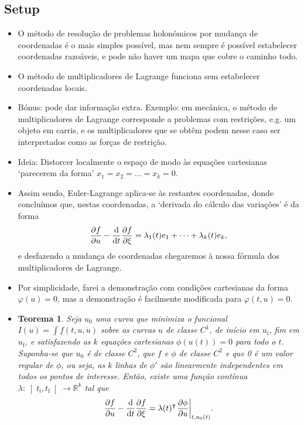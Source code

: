 \documentclass{article}
\theoremstyle{plain}
\newtheorem{theorem}{Teorema}
\theoremstyle{plain}
\theoremstyle{nonumberplain}
\theoremstyle{empty}
\newcommand{\R}{\mathbb{R}}
\newcommand{\tr}{\intercal}
\newcommand{\tstart}{\mathrm{i}}
\newcommand{\tend}{\mathrm{f}}
\DeclarePairedDelimiter\eval{.}{\rvert}
\begin{document}
\subsection{Setup}

\begin{itemize}
\item O método de resolução de problemas holonómicos por mudança de coordenadas é o mais simples possível, mas nem sempre é possível estabelecer coordenadas razoáveis, e pode não haver um mapa que cobre o caminho todo.

\item O método de multiplicadores de Lagrange funciona sem estabelecer coordenadas locais.

\item Bónus: pode dar informação extra. Exemplo: em mecânica, o método de multiplicadores de Lagrange corresponde a problemas com restrições, e.g. um objeto em carris, e os multiplicadores que se obtêm podem nesse caso ser interpretados como as forças de restrição.

\item Ideia: Distorcer localmente o espaço de modo às equações cartesianas `parecerem da forma' $x_1 = x_2 = \dots = x_k = 0$.

\item Assim sendo, Euler-Lagrange aplica-se às restantes coordenadas, donde concluímos que, nestas coordenadas, a `derivada do cálculo das variações' é da forma
\[\diffp f u - \diff*{\diffp f \xi}t = \lambda_1(t) e_1 + \dots + \lambda_k(t) e_k,\]
e desfazendo a mudança de coordenadas chegaremos à nossa fórmula dos multiplicadores de Lagrange.

\item Por simplicidade, farei a demonstração com condições cartesianas da forma $\varphi(u) = 0$, mas a demonstração é facilmente modificada para $\varphi(t,u) = 0$.

\item \begin{theorem}\label{lagrangeholonomic}
Seja $u_0$ uma curva que minimiza o funcional $I(u) = \int f(t,u,\dot u)$ sobre as curvas $u$ de classe $C^1$, de início em $u_\tstart$, fim em $u_\tend$, e satisfazendo as $k$ equações cartesianas $\phi(u(t)) = 0$ para todo o $t$. Suponha-se que $u_0$ é de classe $C^2$, que $f$ e $\phi$ de classe $C^2$ e que 0 é um valor regular de $\phi$, ou seja, as $k$ linhas de $\phi'$ são linearmente independentes em todos os pontos de interesse. Então, existe uma função contínua $\lambda \colon \left]t_\tstart, t_\tend\right[ \to \R^k$ tal que
\begin{equation}\label{eq:lagrangeholonomic}
\diffp f u - \diff*{\diffp f \xi}t = \lambda(t)^\tr \eval*{\diffp{\phi}{u}}_{t,u_0(t)}.
\end{equation}
\end{theorem}


\end{itemize}
\end{document}
